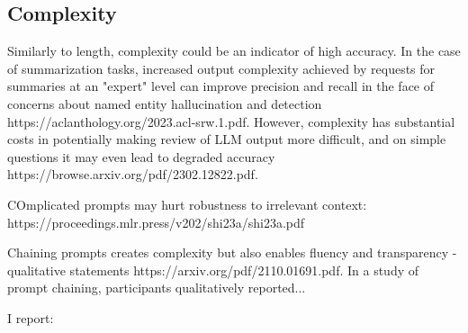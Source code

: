 \documentclass[11pt]{article}
\begin{document}
\subsection*{Complexity}

Similarly to length, complexity could be an indicator of high accuracy. In the case of summarization tasks, increased output complexity achieved by requests for summaries at an "expert" level can improve precision and recall in the face of concerns about named entity hallucination and detection https://aclanthology.org/2023.acl-srw.1.pdf. However, complexity has substantial costs in potentially making review of LLM output more difficult, and on simple questions it may even lead to degraded accuracy https://browse.arxiv.org/pdf/2302.12822.pdf. 

COmplicated prompts may hurt robustness to irrelevant context: https://proceedings.mlr.press/v202/shi23a/shi23a.pdf

Chaining prompts creates complexity but also enables fluency and transparency - qualitative statements https://arxiv.org/pdf/2110.01691.pdf. In a study of prompt chaining, participants qualitatively reported...

I report:
\end{document}
